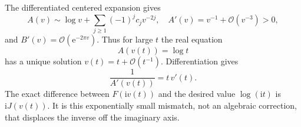 \documentclass[11pt,a4paper]{article}
\theoremstyle{definition}
\numberwithin{equation}{section}
\newcommand{\ii}{\mathrm{i}}
\newcommand{\ee}{\mathrm{e}}
\newcommand{\Oh}{\mathcal O}
\begin{document}
The differentiated centered expansion gives
\begin{equation}
 A(v)\sim\log v+\sum_{j\ge1}(-1)^jc_jv^{-2j},\quad
 A'(v)=v^{-1}+\Oh(v^{-3})>0,
 \label{eq:A-expansion}
\end{equation}
and $B'(v)=\Oh(\ee^{-2\pi v})$. Thus for large $t$ the real equation
\begin{equation}
 A(v(t))=\log t
 \label{eq:v-definition}
\end{equation}
has a unique solution $v(t)=t+\Oh(t^{-1})$. Differentiation gives
\begin{equation}
 \frac1{A'(v(t))}=t\,v'(t).
 \label{eq:v-derivative}
\end{equation}
The exact difference between $F(\ii v(t))$ and the desired value $\log(\ii t)$ is $\ii J(v(t))$. It is this exponentially small mismatch, not an algebraic correction, that displaces the inverse off the imaginary axis.
\end{document}
